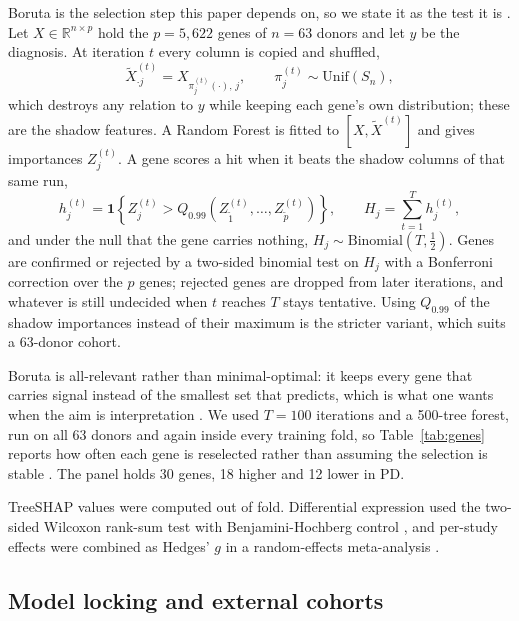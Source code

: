 \documentclass[11pt,a4paper]{article}
\begin{document}
Boruta is the selection step this paper depends on, so we state it as the test it is \citep{kursa2010}. Let
$X \in \mathbb{R}^{n \times p}$ hold the $p = 5{,}622$ genes of $n = 63$ donors and let $y$ be the diagnosis.
At iteration $t$ every column is copied and shuffled,
%
\begin{equation}
\tilde{X}^{(t)}_{\cdot j} = X_{\pi^{(t)}_j(\cdot),\, j}, \qquad \pi^{(t)}_j \sim \text{Unif}(S_n),
\end{equation}
%
which destroys any relation to $y$ while keeping each gene's own distribution; these are the shadow features.
A Random Forest is fitted to $[X, \tilde{X}^{(t)}]$ and gives importances $Z^{(t)}_j$. A gene scores a hit
when it beats the shadow columns of that same run,
%
\begin{equation}
h^{(t)}_j = \mathbf{1}\!\left\{ Z^{(t)}_j > Q_{0.99}\!\left( Z^{(t)}_{\tilde{1}}, \dots, Z^{(t)}_{\tilde{p}} \right) \right\},
\qquad
H_j = \sum_{t=1}^{T} h^{(t)}_j ,
\end{equation}
%
and under the null that the gene carries nothing, $H_j \sim \text{Binomial}(T, \tfrac{1}{2})$. Genes are
confirmed or rejected by a two-sided binomial test on $H_j$ with a Bonferroni correction over the $p$ genes;
rejected genes are dropped from later iterations, and whatever is still undecided when $t$ reaches $T$ stays
tentative. Using $Q_{0.99}$ of the shadow importances instead of their maximum is the stricter variant, which
suits a 63-donor cohort.

Boruta is all-relevant rather than minimal-optimal: it keeps every gene that carries signal instead of the
smallest set that predicts, which is what one wants when the aim is interpretation
\citep{kursa2010,degenhardt2019}. We used $T = 100$ iterations and a 500-tree forest, run on all 63 donors and
again inside every training fold, so Table~\ref{tab:genes} reports how often each gene is reselected rather
than assuming the selection is stable \citep{degenhardt2019}. The panel holds 30 genes, 18 higher and 12 lower
in PD.

TreeSHAP values \citep{lundberg2020} were computed out of fold. Differential expression used
the two-sided Wilcoxon rank-sum test \citep{mannwhitney1947} with Benjamini-Hochberg control \citep{bh1995}, and
per-study effects were combined as Hedges' $g$ \citep{hedges1981} in a random-effects meta-analysis
\citep{dersimonian1986}.

\subsection{Model locking and external cohorts}
\end{document}
